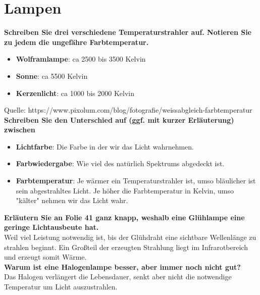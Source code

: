 \documentclass[a4paper]{article}
\begin{document}
	\newpage
	
	\section{Lampen}
	\textbf{Schreiben Sie drei verschiedene Temperaturstrahler auf. Notieren Sie zu jedem die ungefähre Farbtemperatur.}\\
	\begin{itemize}
		\item \textbf{Wolframlampe}: ca 2500 bis 3500 Kelvin\\
		\item \textbf{Sonne}: ca 5500 Kelvin\\
		\item \textbf{Kerzenlicht}: ca 1000 bis 2000 Kelvin\\
	\end{itemize}
	Quelle: https://www.pixolum.com/blog/fotografie/weissabgleich-farbtemperatur\\
	
	\textbf{Schreiben Sie den Unterschied auf (ggf. mit kurzer Erläuterung) zwischen}\\
	\begin{itemize}
		\item \textbf{Lichtfarbe}: Die Farbe in der wir das Licht wahrnehmen.\\
		\item \textbf{Farbwiedergabe}: Wie viel des natürlich Spektrums abgedeckt ist.\\
		\item \textbf{Farbtemperatur}: Je wärmer ein Temperaturstrahler ist, umso bläulicher ist sein abgestrahltes Licht. Je höher die Farbtemperatur in Kelvin, umso "kälter" nehmen wir das Licht wahr.\\
	\end{itemize}
	
	\textbf{Erläutern Sie an Folie 41 ganz knapp, weshalb eine Glühlampe eine geringe Lichtausbeute hat.}\\
	Weil viel Leistung notwendig ist, bis der Glühdraht eine sichtbare Wellenlänge zu strahlen beginnt. Ein Großteil der erzeugten Strahlung liegt im Infrarotbereich und erzeugt somit Wärme.\\
	
	\textbf{Warum ist eine Halogenlampe besser, aber immer noch nicht gut?}\\
	Das Halogen verlängert die Lebensdauer, senkt aber nicht die notwendige Temperatur um Licht auszustrahlen.\\
	
\end{document}
